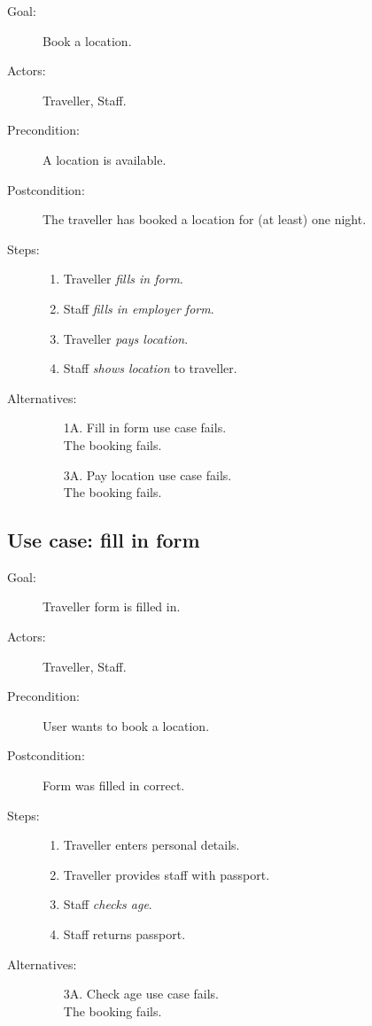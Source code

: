 \begin{description}
\item[Goal:] Book a location.
\item[Actors:] Traveller, Staff.
\item[Precondition:] A location is available.
\item[Postcondition:] The traveller has booked a location for (at least) one night.
\item[Steps:]
\begin{enumerate}
\item Traveller \textit{fills in form}.
\item Staff \textit{fills in employer form}.
\item Traveller \textit{pays location}.
\item Staff \textit{shows location} to traveller.
\end{enumerate}

\item[Alternatives:]
\begin{enumerate}
\item[1A.] Fill in form use case fails.\\
The booking fails.
\item[3A.] Pay location use case fails.\\
The booking fails.
\end{enumerate}
\end{description}

\subsection{Use case: fill in form}

\begin{description}
\item[Goal:] Traveller form is filled in.
\item[Actors:] Traveller, Staff.
\item[Precondition:] User wants to book a location.
\item[Postcondition:] Form was filled in correct.
\item[Steps:]
\begin{enumerate}
\item Traveller enters personal details.
\item Traveller provides staff with passport.
\item Staff \textit{checks age}.
\item Staff returns passport.
\end{enumerate}

\item[Alternatives:]
\begin{enumerate}
\item[3A.] Check age use case fails.\\
The booking fails.
\end{enumerate}
\end{description}


